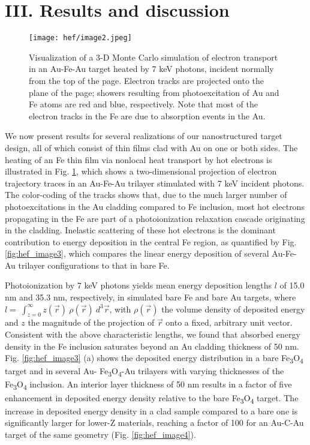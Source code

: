 \section{III. Results and discussion}

\begin{figure}[h]
\caption{
Visualization of a 3-D Monte Carlo simulation of
electron transport in an Au-Fe-Au target heated by 7 keV photons,
incident normally from the top of the page. Electron tracks are
projected onto the plane of the page; showers resulting from
photoexcitation of Au and Fe atoms are red and blue, respectively. Note
that most of the electron tracks in the Fe are due to absorption events
in the Au.
}
\label{fig:hef_image2}
\centering
\texttt{[image: hef/image2.jpeg]}
\end{figure}

We now present results for several realizations of our nanostructured
target design, all of which consist of thin films clad with Au on one or
both sides. The heating of an Fe thin film via nonlocal heat transport
by hot electrons is illustrated in Fig. \ref{fig:hef_image2}, which shows a two-dimensional
projection of electron trajectory traces in an Au-Fe-Au trilayer
stimulated with 7 keV incident photons. The color-coding of the tracks
shows that, due to the much larger number of photoexcitations in the Au
cladding compared to Fe inclusion, most hot electrons propagating in the
Fe are part of a photoionization relaxation cascade originating in the
cladding. Inelastic scattering of these hot electrons is the dominant
contribution to energy deposition in the central Fe region, as
quantified by Fig. \ref{fig:hef_image3}, which compares the linear energy deposition of
several Au-Fe-Au trilayer configurations to that in bare Fe.

Photoionization by 7 keV photons yields mean energy deposition lengths
\(l\) of 15.0 nm and 35.3 nm, respectively, in simulated bare Fe and
bare Au targets, where
\(l = \ \int_{z = 0}^{\infty}{z(\overrightarrow{r})\ \rho\left( \overrightarrow{r} \right)\ d^{3}\overrightarrow{r}}\),
with \(\rho\left( \overrightarrow{r} \right)\) the volume density of
deposited energy and \(z\) the magnitude of the projection of
\(\overrightarrow{r}\) onto a fixed, arbitrary unit vector. Consistent
with the above characteristic lengths, we found that absorbed energy
density in the Fe inclusion saturates beyond an Au cladding thickness of
50 nm. Fig. \ref{fig:hef_image3} (a) shows the deposited energy distribution in a bare
Fe\textsubscript{3}O\textsubscript{4} target and in several Au-
Fe\textsubscript{3}O\textsubscript{4}-Au trilayers with varying
thicknesses of the Fe\textsubscript{3}O\textsubscript{4} inclusion. An
interior layer thickness of 50 nm results in a factor of five
enhancement in deposited energy density relative to the bare
Fe\textsubscript{3}O\textsubscript{4} target. The increase in deposited
energy density in a clad sample compared to a bare one is significantly
larger for lower-Z materials, reaching a factor of 100 for an Au-C-Au
target of the same geometry (Fig. \ref{fig:hef_image4}).

